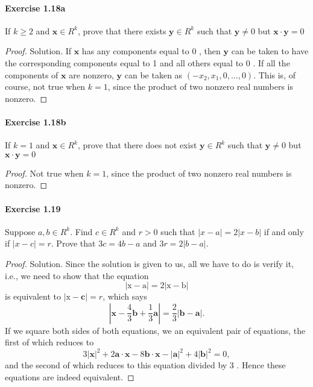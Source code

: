 \documentclass{article}
\theoremstyle{definition}
\begin{document}
\paragraph{Exercise 1.18a} If $k \geq 2$ and $\mathbf{x} \in R^{k}$, prove that there exists $\mathbf{y} \in R^{k}$ such that $\mathbf{y} \neq 0$ but $\mathbf{x} \cdot \mathbf{y}=0$
\begin{proof}
    Solution. If $\mathbf{x}$ has any components equal to 0 , then $\mathbf{y}$ can be taken to have the corresponding components equal to 1 and all others equal to 0 . If all the components of $\mathbf{x}$ are nonzero, $\mathbf{y}$ can be taken as $\left(-x_2, x_1, 0, \ldots, 0\right)$. This is, of course, not true when $k=1$, since the product of two nonzero real numbers is nonzero.
\end{proof}


\paragraph{Exercise 1.18b} If $k = 1$ and $\mathbf{x} \in R^{k}$, prove that there does not exist $\mathbf{y} \in R^{k}$ such that $\mathbf{y} \neq 0$ but $\mathbf{x} \cdot \mathbf{y}=0$
\begin{proof}
    Not true when $k=1$, since the product of two nonzero real numbers is nonzero.
\end{proof}


\paragraph{Exercise 1.19} Suppose $a, b \in R^k$. Find $c \in R^k$ and $r > 0$ such that $|x-a|=2|x-b|$ if and only if $| x - c | = r$. Prove that $3c = 4b - a$ and $3r = 2 |b - a|$.
\begin{proof}
    Solution. Since the solution is given to us, all we have to do is verify it, i.e., we need to show that the equation
$$
|\mathrm{x}-\mathrm{a}|=2|\mathrm{x}-\mathrm{b}|
$$
is equivalent to $|\mathrm{x}-\mathbf{c}|=r$, which says
$$
\left|\mathbf{x}-\frac{4}{3} \mathbf{b}+\frac{1}{3} \mathbf{a}\right|=\frac{2}{3}|\mathbf{b}-\mathbf{a}| .
$$
If we square both sides of both equations, we an equivalent pair of equations, the first of which reduces to
$$
3|\mathbf{x}|^2+2 \mathbf{a} \cdot \mathbf{x}-8 \mathbf{b} \cdot \mathbf{x}-|\mathbf{a}|^2+4|\mathbf{b}|^2=0,
$$
and the second of which reduces to this equation divided by 3 . Hence these equations are indeed equivalent.
\end{proof}
\end{document}

